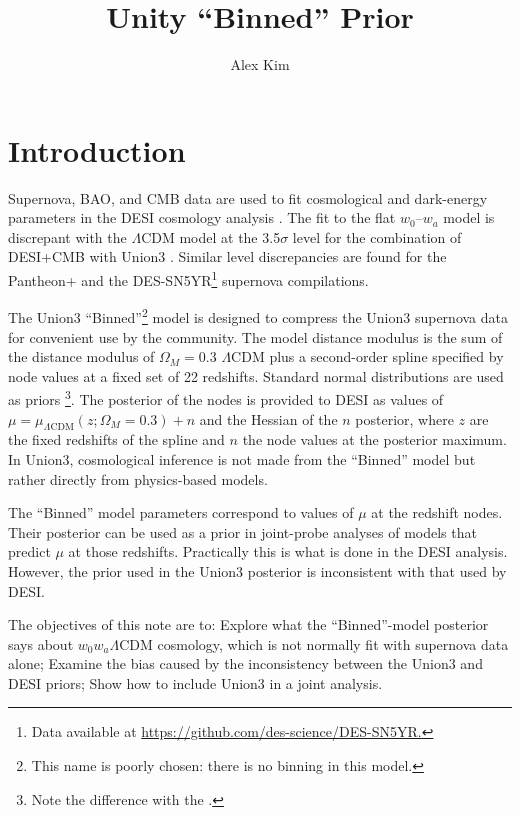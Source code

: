 \documentclass[11pt,a4paper]{article}
\title{Unity ``Binned'' Prior}
\author[a]{Alex Kim}
\affiliation[a]{Lawrence Berkeley National Laboratory}
\begin{document}
\maketitle

\section{Introduction}
Supernova, BAO, and CMB data are used to fit cosmological and dark-energy parameters in the DESI cosmology
analysis \cite{2024arXiv240403002D}.  The fit to the flat $w_0$--$w_a$ model is discrepant with the $\Lambda$CDM
model at the 3.5$\sigma$ level for the combination of DESI+CMB with Union3  \cite{2023arXiv231112098R}.
Similar level discrepancies are found for the Pantheon+ \cite{2022ApJ...938..113S} and the DES-SN5YR\footnote{Data available at \url{https://github.com/des-science/DES-SN5YR.}} supernova compilations.


The Union3 ``Binned''\footnote{This name is poorly chosen: there is no binning in this model.} model is designed to compress the Union3 supernova data for convenient use by the community.  
The  model distance modulus
is the sum of the distance modulus of $\Omega_M=0.3$  $\Lambda$CDM plus a second-order spline specified by node values
at a fixed set of 22 redshifts.   Standard normal distributions are used as priors \footnote{Note the difference with the .}.  
The posterior of the nodes is provided to DESI as values of
$\mu = \mu_{\Lambda \text{CDM}}(z;\Omega_M=0.3) + n$ and the Hessian of the $n$ posterior,
where $z$ are the fixed redshifts of the spline and $n$ the node values at the posterior maximum.
In Union3, cosmological inference is not made from the ``Binned'' model but rather directly from physics-based models.

The ``Binned'' model parameters correspond to values of $\mu$ at the redshift nodes.
Their  posterior can  be used as a prior in joint-probe analyses of models that predict $\mu$ at those redshifts. 
Practically this is what is done in the DESI 
analysis. However, the prior used in the Union3 posterior is inconsistent with that used by DESI. 

The objectives of this note are to: Explore what the ``Binned''-model posterior says about $w_0w_a\Lambda$CDM cosmology, which is not normally
fit with  supernova data alone;
Examine the bias caused by the inconsistency between the Union3 and DESI priors; Show how to include Union3 in a joint analysis.
\end{document}
